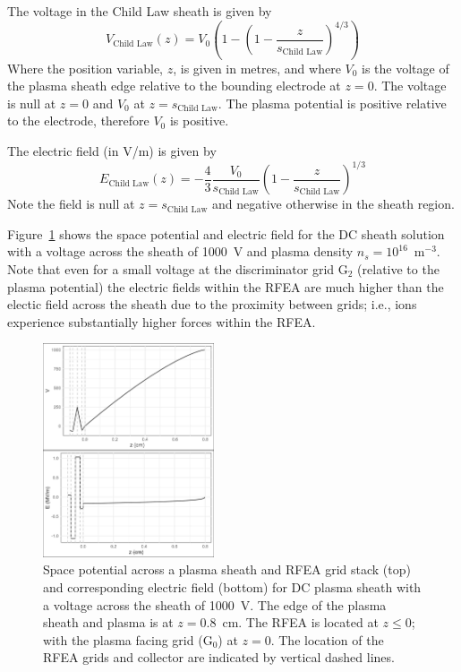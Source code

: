The voltage in the Child Law sheath is given by
\begin{equation}
V_\text{Child Law}(z) = V_0 \left( 1 -  \left( 1 -\frac{z}{s_\text{Child Law}} \right)^{4/3} \right)
\end{equation}
Where the position variable, $z$, is given in metres, and where $V_0$ is the voltage of the plasma sheath edge relative to the bounding electrode at $z=0$. The voltage is null at $z=0$ and $V_0$ at $z=s_\text{Child Law}$. The plasma potential is positive relative to the electrode, therefore $V_0$ is positive.

The electric field (in V/m) is given by
\begin{equation}
E_\text{Child Law}(z) = -\frac{4}{3} \frac{V_0}{s_\text{Child Law}} \left( 1 - \frac{z}{s_\text{Child Law}}  \right)^{1/3}
\end{equation}
Note the field is null at $z=s_\text{Child Law}$ and negative otherwise in the sheath region. 

Figure~\ref{fig:DCpotentialField} shows the space potential and electric field for the DC sheath solution with a voltage across the sheath of 1000~V and plasma density $n_s = 10^{16}$~m$^{-3}$. Note that even for a small voltage at the discriminator grid G$_2$ (relative to the plasma potential) the electric fields within the RFEA are much higher than the electic field across the sheath due to the proximity between grids; i.e., ions experience substantially higher forces within the RFEA. 

\begin{figure}[htbp]
\centering
\includegraphics[width=0.45\textwidth]{Figures/VEz2DC1kVStack2332.jpeg}
\caption{Space potential across a plasma sheath and RFEA grid stack (top) and corresponding electric field (bottom) for DC plasma sheath with a voltage across the sheath of 1000~V. The edge of the plasma sheath and plasma is at $z=0.8$~cm. The RFEA is located at $z\le0$; with the plasma facing grid (G$_0$) at $z=0$. The location of the RFEA grids and collector are indicated by vertical dashed lines.}
\label{fig:DCpotentialField}
\end{figure}



